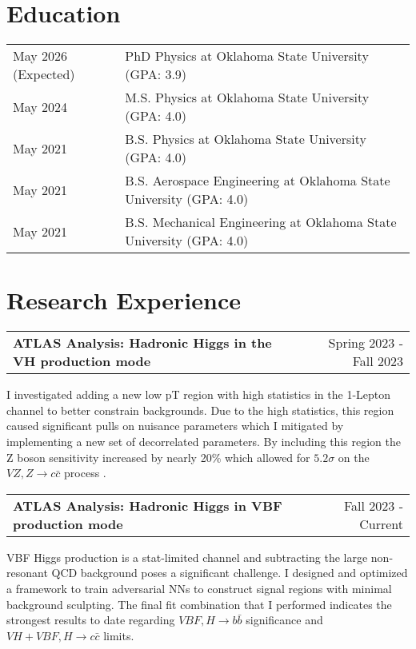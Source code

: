 \documentclass[a4paper,12pt]{article}
\makeatletter
\newenvironment{jobshort}[2]
    {
    \begin{tabularx}{\linewidth}{@{}l X r@{}}
    \textbf{#1} & \hfill &  #2 \\[3.75pt]
    \end{tabularx}
    }
    {
    }
\makeatother
\begin{document}
\section{Education}
\begin{tabularx}{\linewidth}{@{}l X@{}}	
May 2026 (Expected) & PhD Physics at Oklahoma State University \hfill \normalsize (GPA: 3.9) \\

May 2024 & M.S. Physics at Oklahoma State University \hfill (GPA: 4.0) \\ 

May 2021 & B.S. Physics at Oklahoma State University \hfill (GPA: 4.0) \\ 

May 2021 & B.S. Aerospace Engineering at Oklahoma State University \hfill (GPA: 4.0) \\ 

May 2021 & B.S. Mechanical Engineering at Oklahoma State University \hfill (GPA: 4.0) \\ 

\end{tabularx}

\section{Research Experience}

\begin{jobshort}{ATLAS Analysis: Hadronic Higgs in the VH production mode}{Spring 2023 - Fall 2023}
I investigated adding a new low pT region with high statistics in the 1-Lepton channel to better constrain backgrounds.
Due to the high statistics, this region caused significant pulls on nuisance parameters which I mitigated by implementing a new set of decorrelated parameters.
By including this region the Z boson sensitivity increased by nearly 20\% which allowed for $5.2\sigma$ on the $VZ, Z\rightarrow c\bar{c}$ process \cite{VH}.
\end{jobshort}

\begin{jobshort}{ATLAS Analysis: Hadronic Higgs in VBF production mode}{Fall 2023 - Current}
VBF Higgs production is a stat-limited channel and subtracting the large non-resonant QCD background poses a significant challenge.
I designed and optimized a framework to train adversarial NNs to construct signal regions with minimal background sculpting.
The final fit combination that I performed indicates the strongest results to date regarding $VBF,H \rightarrow b\bar{b}$ significance and $VH+VBF,H \rightarrow c\bar{c}$ limits.
\end{jobshort}
\end{document}
